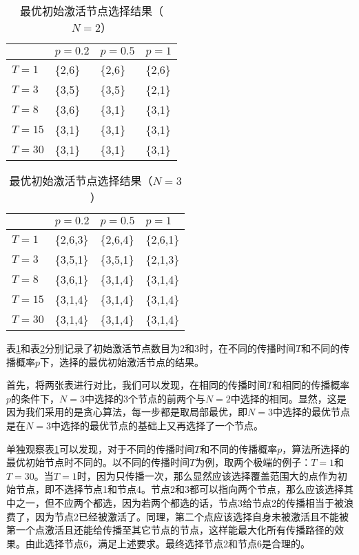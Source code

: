 \documentclass[UTF8]{ctexart}
\begin{document}
\begin{table}[h!]
	\centering
	\begin{tabular}{|m{2cm}<{\centering}|m{3cm}<{\centering}|m{3cm}<{\centering}|m{3cm}<{\centering}|}
		\hline
		\diagbox{$\ \ T\ \ $}{$V_{init}$}{$\ \ p\ \ $} & $p=0.2$ & $p=0.5$  &$p=1$ \\
		\hline
		$T=1$ & \{2,6\} & \{2,6\} &\{2,6\}\\
		\hline
		$T=3$ & \{3,5\} & \{3,5\} &\{2,1\}\\
		\hline
		$T=8$ & \{3,6\} & \{3,1\} &\{3,1\}\\
		\hline
		$T=15$ & \{3,1\} & \{3,1\} &\{3,1\}\\
		\hline
		$T=30$ & \{3,1\} & \{3,1\} &\{3,1\}\\
		\hline
	\end{tabular}
	\caption{最优初始激活节点选择结果（$N=2$）}
	\label{N=2}
\end{table}
\begin{table}[h!]
	\centering
	\begin{tabular}{|m{2cm}<{\centering}|m{3cm}<{\centering}|m{3cm}<{\centering}|m{3cm}<{\centering}|}
		\hline
		\diagbox{$\ \ T\ \ $}{$V_{init}$}{$\ \ p\ \ $} & $p=0.2$ & $p=0.5$  &$p=1$ \\
		\hline
		$T=1$ & \{2,6,3\} & \{2,6,4\} &\{2,6,1\}\\
		\hline
		$T=3$ & \{3,5,1\} & \{3,5,1\} &\{2,1,3\}\\
		\hline
		$T=8$ & \{3,6,1\} & \{3,1,4\} &\{3,1,4\}\\
		\hline
		$T=15$ & \{3,1,4\} & \{3,1,4\} &\{3,1,4\}\\
		\hline
		$T=30$ & \{3,1,4\} & \{3,1,4\} &\{3,1,4\}\\
		\hline
	\end{tabular}
	\caption{最优初始激活节点选择结果（$N=3$）}
	\label{N=3}
\end{table}

表\ref{N=2}和表\ref{N=3}分别记录了初始激活节点数目为2和3时，在不同的传播时间$T$和不同的传播概率$p$下，选择的最优初始激活节点的结果。

首先，将两张表进行对比，我们可以发现，在相同的传播时间$T$和相同的传播概率$p$的条件下，$N=3$中选择的3个节点的前两个与$N=2$中选择的相同。显然，这是因为我们采用的是贪心算法，每一步都是取局部最优，即$N=3$中选择的最优节点是在$N=3$中选择的最优节点的基础上又再选择了一个节点。

单独观察表\ref{N=2}可以发现，对于不同的传播时间$T$和不同的传播概率$p$，算法所选择的最优初始节点时不同的。以不同的传播时间$T$为例，取两个极端的例子：$T=1$和$T=30$。当$T=1$时，因为只传播一次，那么显然应该选择覆盖范围大的点作为初始节点，即不选择节点1和节点4。节点2和3都可以指向两个节点，那么应该选择其中之一，但不应两个都选，因为若两个都选的话，节点3给节点2的传播相当于被浪费了，因为节点2已经被激活了。同理，第二个点应该选择自身未被激活且不能被第一个点激活且还能给传播至其它节点的节点，这样能最大化所有传播路径的效果。由此选择节点6，满足上述要求。最终选择节点2和节点6是合理的。
\end{document}
